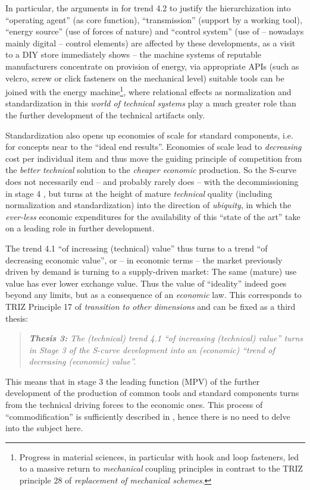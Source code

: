 \documentclass[11pt,a4paper]{article}
\begin{document}
In particular, the arguments in \cite{TESE2018} for trend 4.2 to justify the
hierarchization into ``operating agent'' (as core function), ``transmission''
(support by a working tool), ``energy source'' (use of forces of nature) and
``control system'' (use of -- nowadays mainly digital -- control elements) are
affected by these developments, as a visit to a DIY store immediately shows --
the machine systems of reputable manufacturers concentrate on provision of
energy, via appropriate APIs (such as velcro, screw or click fasteners on the
mechanical level) suitable tools can be joined with the energy
machine\footnote{Progress in material sciences, in particular with hook and
  loop fasteners, led to a massive return to \emph{mechanical} coupling
  principles in contrast to the TRIZ principle 28 of \emph{replacement of
    mechanical schemes}.}, where relational effects as normalization and
standardization in this \emph{world of technical systems} play a much greater
role than the further development of the technical artifacts only.

Standardization also opens up economies of scale for standard components,
i.e. for concepts near to the ``ideal end results''.  Economies of scale lead
to \emph{decreasing} cost per individual item and thus move the guiding
principle of competition from the \emph{better technical} solution to the
\emph{cheaper economic} production. So the S-curve does not necessarily end --
and probably rarely does -- with the decommissioning in stage 4
\cite[p. 38]{TESE2018}, but turns at the height of mature \emph{technical}
quality (including normalization and standardization) into the direction of
\emph{ubiquity}, in which the \emph{ever-less} economic expenditures for the
availability of this ``state of the art'' take on a leading role in further
development.

The trend 4.1 ``of increasing (technical) value'' thus turns to a trend ``of
decreasing economic value'', or -- in economic terms -- the market previously
driven by demand is turning to a supply-driven market: The same (mature) use
value has ever lower exchange value. Thus the value of ``ideality''
\cite[chapter 4.1.1]{KS2017} indeed goes beyond any limits, but as a
consequence of an \emph{economic} law. This corresponds to TRIZ Principle 17
of \emph{transition to other dimensions} and can be fixed as a third thesis:
\begin{quote}\it
 \textbf{Thesis 3:} The (technical) trend 4.1 ``of increasing (technical)
 value'' turns in Stage 3 of the S-curve development into an (economic)
 ``trend of decreasing (economic) value''.
\end{quote}
This means that in stage 3 the leading function (MPV) of the further
development of the production of common tools and standard components turns
from the technical driving forces to the economic ones. This process of
``commodification'' is sufficiently described in \cite{Naetar2005}, hence
there is no need to delve into the subject here. 
\end{document}
